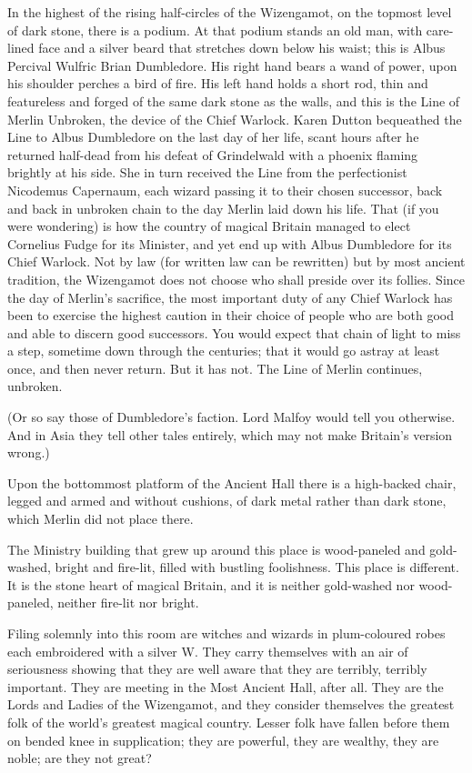 In the highest of the rising half-circles of the Wizengamot, on the
topmost level of dark stone, there is a podium. At that podium stands an
old man, with care-lined face and a silver beard that stretches down
below his waist; this is Albus Percival Wulfric Brian Dumbledore. His
right hand bears a wand of power, upon his shoulder perches a bird of
fire. His left hand holds a short rod, thin and featureless and forged
of the same dark stone as the walls, and this is the Line of Merlin
Unbroken, the device of the Chief Warlock. Karen Dutton bequeathed the
Line to Albus Dumbledore on the last day of her life, scant hours after
he returned half-dead from his defeat of Grindelwald with a phoenix
flaming brightly at his side. She in turn received the Line from the
perfectionist Nicodemus Capernaum, each wizard passing it to their
chosen successor, back and back in unbroken chain to the day Merlin laid
down his life. That (if you were wondering) is how the country of
magical Britain managed to elect Cornelius Fudge for its Minister, and
yet end up with Albus Dumbledore for its Chief Warlock. Not by law (for
written law can be rewritten) but by most ancient tradition, the
Wizengamot does not choose who shall preside over its follies. Since the
day of Merlin's sacrifice, the most important duty of any Chief Warlock
has been to exercise the highest caution in their choice of people who
are both good and able to discern good successors. You would expect that
chain of light to miss a step, sometime down through the centuries; that
it would go astray at least once, and then never return. But it has not.
The Line of Merlin continues, unbroken.

(Or so say those of Dumbledore's faction. Lord Malfoy would tell you
otherwise. And in Asia they tell other tales entirely, which may not
make Britain's version wrong.)

Upon the bottommost platform of the Ancient Hall there is a high-backed
chair, legged and armed and without cushions, of dark metal rather than
dark stone, which Merlin did not place there.

The Ministry building that grew up around this place is wood-paneled and
gold-washed, bright and fire-lit, filled with bustling foolishness. This
place is different. It is the stone heart of magical Britain, and it is
neither gold-washed nor wood-paneled, neither fire-lit nor bright.

Filing solemnly into this room are witches and wizards in plum-coloured
robes each embroidered with a silver W. They carry themselves with an
air of seriousness showing that they are well aware that they are
terribly, terribly important. They are meeting in the Most Ancient Hall,
after all. They are the Lords and Ladies of the Wizengamot, and they
consider themselves the greatest folk of the world's greatest magical
country. Lesser folk have fallen before them on bended knee in
supplication; they are powerful, they are wealthy, they are noble; are
they not great?

